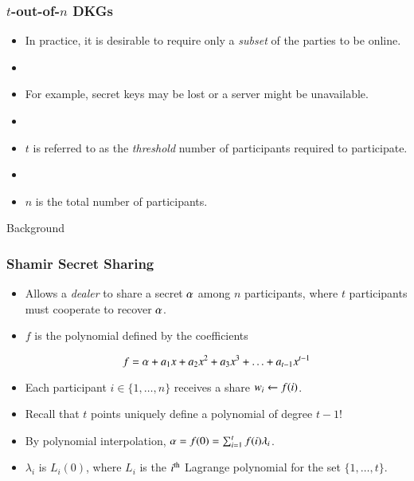 \documentclass[hyperref={pdfpagelabels=true},table,dvipsnames,14pt,aspectratio=169]{beamer}
\begin{document}
\begin{frame}
  \frametitle{$t$-out-of-$n$ DKGs}

  \begin{itemize}
    \item In practice, it is desirable to require only a \emph{subset} of the parties to be online.
    \item[]
    \item<2-> For example, secret keys may be lost or a server might be unavailable.
    \item[]
    \item<3-> $t$ is referred to as the \emph{threshold} number of participants required to participate.
    \item[]
    \item<4-> $n$ is the total number of participants.
  \end{itemize}
\end{frame}


\begin{frame}
  \huge
  \centering
  Background
\end{frame}

\begin{frame}
  \frametitle{Shamir Secret Sharing}

  \begin{itemize}
    \item<1-> Allows a \emph{dealer} to share a secret $\alpha$ among $n$ participants, where $t$ participants must cooperate to recover $\alpha$.
    \item<2-> $f$ is the polynomial defined by the coefficients

      \[f = \alpha + a_1 x + a_2 x^2 + a_3 x^3 + \ldots + a_{t-1}x^{t-1}  \]

    \item<3-> Each participant $i \in \{1, \ldots, n \}$ receives a share $w_i \gets f(i) $.
    \item<4-> Recall that $t$ points uniquely define a polynomial of degree $t-1$!
    \item<5-> By polynomial interpolation, $\alpha = f(0) = \sum_{i=1}^t f(i) \lambda_i$.
    \item<6-> $\lambda_i$ is $L_i(0)$, where $L_i$ is the $i^{\textrm{\scriptsize th}}$ Lagrange polynomial for the set $\{1, \ldots, t \}$.
  \end{itemize}
\end{frame}
\end{document}
